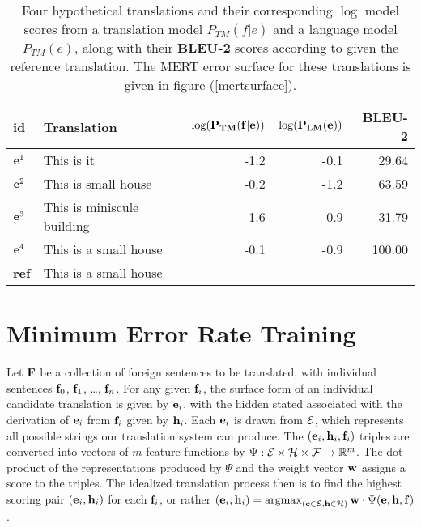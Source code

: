 \documentclass[11pt]{article}
\DeclareMathOperator*{\argmax}{argmax}
\begin{document}
\begin{table*}
\begin{center}
\begin{tabular}{|l|lrrr|}
\hline \bf id & \bf Translation  & $\bf \log(P_{TM}(f|e))$  & $\bf \log(P_{LM}(e))$ & {\bf BLEU-2} \\
\hline
${\bf e}^1$ & This is it  & -1.2 & -0.1 & 29.64 \\
${\bf e}^2$ & This is small house   & -0.2 & -1.2 & 63.59 \\
${\bf e}^3$ & This is miniscule building   & -1.6 & -0.9 & 31.79  \\
${\bf e}^4$ & This is a small house   & -0.1 & -0.9 & 100.00  \\
\hline
{\bf ref}  & This is a small house & & & \\
\hline
\end{tabular}
\end{center}
\caption{
\label{hscores}
Four hypothetical translations and their corresponding $\log$ model scores from a translation model $P_{TM}(f|e)$ and a language model $P_{TM}(e)$, along with their {\bf BLEU-2} scores according to given the reference translation. The MERT error surface for these translations is given in figure (\ref{mertsurface}).}
\end{table*}

\section{Minimum Error Rate Training}

Let ${\bf F}$ be a collection of foreign sentences to be translated, with individual sentences ${\bf f}_0$, ${\bf f}_1$, \ldots, ${\bf f}_n$. For any given ${\bf f}_i$, the surface form of an individual candidate translation is given by ${\bf e}_i$, with the hidden stated associated with the derivation of ${\bf e}_i$ from ${\bf f}_i$ given by ${\bf h}_i$. Each ${\bf e}_i$ is drawn from ${\cal E}$, which represents all possible strings our translation system can produce. The $({\bf e}_i, {\bf h}_i, {\bf f}_i)$ triples are converted into vectors of $m$ feature functions by ${\Psi }:{\cal E}\times{\cal H}\times{\cal F} \rightarrow \mathbb{R}^m$. The dot product of the representations produced by ${\Psi}$ and the weight vector ${\bf w}$ assigns a score to the triples. The idealized translation process then is to find the highest scoring pair $({\bf e}_i, {\bf h}_i)$ for each ${\bf f}_i$, or rather $({\bf e}_i, {\bf h}_i) = \argmax_{({\bf e} \in {\cal E}, {\bf h} \in {\cal H})} {\bf w} \cdot \Psi({\bf e}, {\bf h}, {\bf f})$. 
\end{document}
